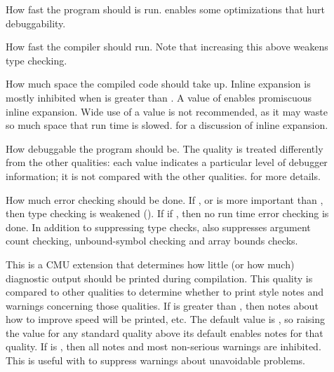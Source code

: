 {\begin{description}
\item[]
How fast the program should is run.
 enables some optimizations that hurt debuggability.

\item[]
How fast the compiler should
run.  Note that increasing this above  weakens type checking.

\item[]
How much space the compiled code should take
up.  Inline expansion is mostly inhibited when  is greater than
.  A value of  enables promiscuous inline expansion.  Wide use of
a  value is not recommended, as it may waste so much space that run time
is slowed.   for a discussion of inline
expansion.

\item[]
How debuggable the program should be.  The
quality is treated differently from the other qualities: each value indicates a
particular level of debugger information; it is not compared with the other
qualities.   for more details.

\item[]
How much error checking should be done.  If
,  or  is more important than
, then type checking is weakened ().  If  if , then no run time error
checking is done.  In addition to suppressing type checks,  also
suppresses argument count checking, unbound-symbol checking and array bounds
checks.

\item[]
This is a CMU extension that
determines how little (or how much) diagnostic output should be printed during
compilation.  This quality is compared to other qualities to determine whether
to print style notes and warnings concerning those qualities.  If  is
greater than , then notes about how to improve speed will
be printed, etc.  The default value is , so raising the value for any
standard quality above its default enables notes for that quality.  If
 is , then all notes and most non-serious warnings are
inhibited.  This is useful with  to suppress warnings about
unavoidable problems.
\end{description}

}
